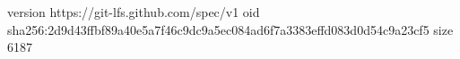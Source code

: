 version https://git-lfs.github.com/spec/v1
oid sha256:2d9d43ffbf89a40e5a7f46c9dc9a5ec084ad6f7a3383effd083d0d54c9a23cf5
size 6187
